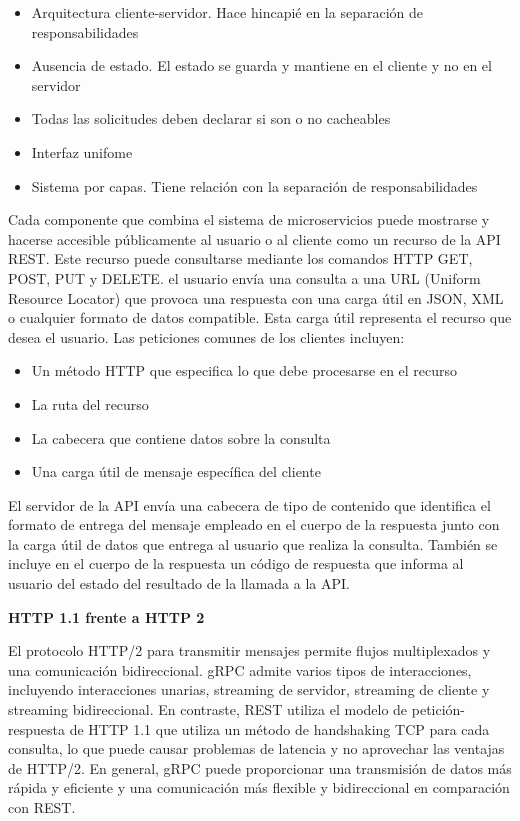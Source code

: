 \begin{itemize}
    \item Arquitectura cliente-servidor.
    Hace hincapié en la separación de responsabilidades
    \item Ausencia de estado.
    El estado se guarda y mantiene en el cliente y no en el servidor
    \item Todas las solicitudes deben declarar si son o no cacheables
    \item Interfaz unifome
    \item Sistema por capas.
    Tiene relación con la separación de responsabilidades
\end{itemize}

Cada componente que combina el sistema de microservicios puede mostrarse y hacerse accesible públicamente al usuario o al cliente como un recurso de la API REST. Este recurso puede consultarse mediante los comandos HTTP GET, POST, PUT y DELETE. el usuario envía una consulta a una URL (Uniform Resource Locator) que provoca una respuesta con una carga útil en JSON, XML o cualquier formato de datos compatible.
Esta carga útil representa el recurso que desea el usuario.
Las peticiones comunes de los clientes incluyen:

\begin{itemize}
    \item Un método HTTP que especifica lo que debe procesarse en el recurso
    \item La ruta del recurso
    \item La cabecera que contiene datos sobre la consulta
    \item Una carga útil de mensaje específica del cliente
\end{itemize}

El servidor de la API envía una cabecera de tipo de contenido que identifica el formato de entrega del mensaje empleado en el cuerpo de la respuesta junto con la carga útil de datos que entrega al usuario que realiza la consulta.
También se incluye en el cuerpo de la respuesta un código de respuesta que informa al usuario del estado del resultado de la llamada a la API\@.

\textbf{HTTP 1.1 frente a HTTP 2}

El protocolo HTTP/2 para transmitir mensajes permite flujos multiplexados y una comunicación bidireccional.
gRPC admite varios tipos de interacciones, incluyendo interacciones unarias, streaming de servidor, streaming de cliente y streaming bidireccional.
En contraste, REST utiliza el modelo de petición-respuesta de HTTP 1.1 que utiliza un método de handshaking TCP para cada consulta, lo que puede causar problemas de latencia y no aprovechar las ventajas de HTTP/2.
En general, gRPC puede proporcionar una transmisión de datos más rápida y eficiente y una comunicación más flexible y bidireccional en comparación con REST\@.

